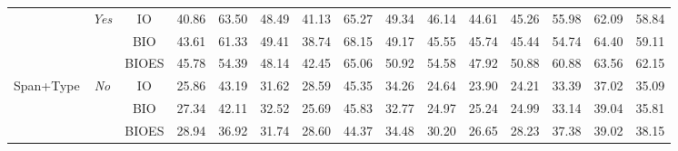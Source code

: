 \documentclass[11pt]{article}
\begin{document}
\begin{table*}[htb]
{\begin{tabular}{ccccccccccccccc}
        \cmidrule(lr){2-2} \cmidrule(lr){3-3} \cmidrule(lr){4-9} \cmidrule(lr){10-15}
                                        & \multirow{3}{*}{\textit{Yes}} & IO                                                & 40.86              & 63.50              & 48.49              & 41.13              & 65.27              & 49.34              & 46.14              & 44.61              & 45.26              & 55.98              & 62.09              & 58.84              \\
                                        &                                                & BIO                              & 43.61              & 61.33              & 49.41              & 38.74              & 68.15              & 49.17              & 45.55              & 45.74              & 45.44              & 54.74              & 64.40              & 59.11              \\
                                        &                                                & BIOES                            & 45.78              & 54.39              & 48.14              & 42.45              & 65.06              & 50.92              & 54.58              & 47.92              & 50.88              & 60.88              & 63.56              & 62.15              \\
        \cmidrule(lr){1-3} \cmidrule(lr){4-9} \cmidrule(lr){10-15} 
        \multirow{6}{*}{Span+Type}      & \multirow{3}{*}{\textit{No}}  & IO                                                & 25.86              & 43.19              & 31.62              & 28.59              & 45.35              & 34.26              & 24.64              & 23.90              & 24.21              & 33.39              & 37.02              & 35.09              \\
                                        &                                                & BIO                              & 27.34              & 42.11              & 32.52              & 25.69              & 45.83              & 32.77              & 24.97              & 25.24              & 24.99              & 33.14              & 39.04              & 35.81              \\
                                        &                                                & BIOES                            & 28.94              & 36.92              & 31.74              & 28.60              & 44.37              & 34.48              & 30.20              & 26.65              & 28.23              & 37.38              & 39.02              & 38.15              \\

\end{tabular}}
\end{table*}
\end{document}
